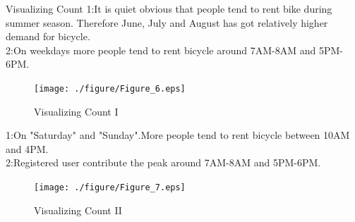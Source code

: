 \documentclass[
 size=14pt,
 paper=smartboard,  %
 mode=present, 		%
 display=slides, 	%
 style=tuliplab,  	%
 pauseslide,
 fleqn,leqno]{powerdot}
\begin{document}
\begin{slide}{Visualizing Count}
	1:It is quiet obvious that people tend to rent bike during summer season. Therefore June, July and August has got relatively higher demand for bicycle.\\
	2:On weekdays more people tend to rent bicycle around 7AM-8AM and 5PM-6PM. 
	\begin{figure}[htbp]
		\texttt{[image: ./figure/Figure\_6.eps]}
		\caption{Visualizing Count I}
	\end{figure}
\end{slide}
\begin{slide}{}
	1:On "Saturday" and "Sunday".More people tend to rent bicycle between 10AM and 4PM.\\
	2:Registered user contribute the peak around 7AM-8AM and 5PM-6PM.
	\begin{figure}[htbp]
		\texttt{[image: ./figure/Figure\_7.eps]}
		\caption{Visualizing Count II}
	\end{figure}
\end{slide}
\end{document}
